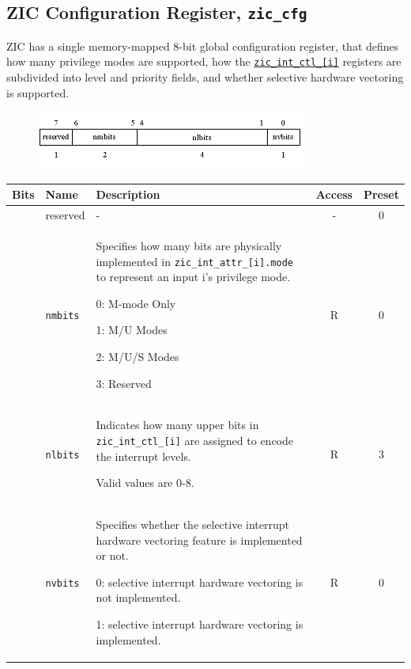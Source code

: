 \subsection{ZIC Configuration Register, \texttt{zic\_cfg}}
\label{subsec:zic-cfg}

ZIC has a single memory-mapped 8-bit global configuration register, that defines how many privilege modes are supported, how the \texttt{\hyperref[subsec:zic-int-ctl]{zic\_int\_ctl\_[i]}} registers are subdivided into level and priority fields, and whether selective hardware vectoring is supported.

\vspace{0.5cm}
\begin{figure}[H]
    \centering
    \includegraphics[width = 9cm]{images/zic_cfg.png}
    \label{fig:zic_cfg}
\end{figure}
\vspace{0.25cm}

\vspace{0.5cm}
\begin{table}[H]
    \label{tab:zic_cfg}
        \centering
        \begin{tabular}{l l p{8cm} c c}
         \hline 
         \textbf{Bits} & \textbf{Name} & \textbf{Description} & \textbf{Access} & \textbf{Preset}\\ \hline \hline
         [7] & reserved & - & - & 0 \\ \hline
         [6:5] & \texttt{nmbits} & Specifies how many bits are physically implemented in \texttt{zic\_int\_attr\_[i].mode} to represent an input i's privilege mode.
         
         0: M-mode Only
         
         1: M/U Modes
         
         2: M/U/S Modes
         
         3: Reserved & R & 0 \\ \hline
         [4:1] & \texttt{nlbits} & Indicates how many upper bits in \texttt{zic\_int\_ctl\_[i]} are assigned to encode the interrupt levels. 
         
         Valid values are 0-8. & R & 3\\ \hline
         [0] & \texttt{nvbits} & Specifies whether the selective interrupt hardware vectoring feature is implemented or not.
         
         0: selective interrupt hardware vectoring is not implemented.
         
         1: selective interrupt hardware vectoring is implemented. & R & 0\\ \hline
         \end{tabular}
\end{table}

